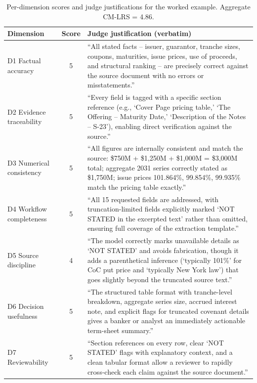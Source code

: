 \documentclass[11pt]{article}
\begin{document}
\begin{table}[h]
\centering
\caption{Per-dimension scores and judge justifications for the worked example. Aggregate CM-LRS = 4.86.}
\label{tab:worked}
\small
\begin{tabularx}{\textwidth}{@{}lcX@{}}
\toprule
\textbf{Dimension} & \textbf{Score} & \textbf{Judge justification (verbatim)} \\
\midrule
D1 Factual accuracy & 5 & ``All stated facts -- issuer, guarantor, tranche sizes, coupons, maturities, issue prices, use of proceeds, and structural ranking -- are precisely correct against the source document with no errors or misstatements.'' \\
\addlinespace
D2 Evidence traceability & 5 & ``Every field is tagged with a specific section reference (e.g., `Cover Page pricing table,' `The Offering -- Maturity Date,' `Description of the Notes -- S-23'), enabling direct verification against the source.'' \\
\addlinespace
D3 Numerical consistency & 5 & ``All figures are internally consistent and match the source: \$750M + \$1{,}250M + \$1{,}000M = \$3{,}000M total; aggregate 2031 series correctly stated as \$1{,}750M; issue prices 101.864\%, 99.854\%, 99.935\% match the pricing table exactly.'' \\
\addlinespace
D4 Workflow completeness & 5 & ``All 15 requested fields are addressed, with truncation-limited fields explicitly marked `NOT STATED in the excerpted text' rather than omitted, ensuring full coverage of the extraction template.'' \\
\addlinespace
D5 Source discipline & 4 & ``The model correctly marks unavailable details as `NOT STATED' and avoids fabrication, though it adds a parenthetical inference (`typically 101\%' for CoC put price and `typically New York law') that goes slightly beyond the truncated source text.'' \\
\addlinespace
D6 Decision usefulness & 5 & ``The structured table format with tranche-level breakdown, aggregate series size, accrued interest note, and explicit flags for truncated covenant details gives a banker or analyst an immediately actionable term-sheet summary.'' \\
\addlinespace
D7 Reviewability & 5 & ``Section references on every row, clear `NOT STATED' flags with explanatory context, and a clean tabular format allow a reviewer to rapidly cross-check each claim against the source document.'' \\
\bottomrule
\end{tabularx}
\end{table}
\end{document}

